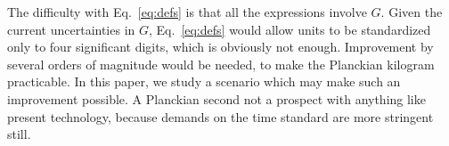 \documentclass[prb,preprint]{revtex4-1}
\begin{document}
The difficulty with Eq.~\eqref{eq:defs} is that all the expressions
involve $G$.  Given the current uncertainties in $G$,
Eq.~\eqref{eq:defs} would allow units to be standardized only to four
significant digits, which is obviously not enough.  Improvement by
several orders of magnitude would be needed, to make the Planckian
kilogram practicable.  In this paper, we study a scenario which may
make such an improvement possible.  A Planckian second not a prospect
with anything like present technology, because demands on the time
standard are more stringent still.




\end{document}
